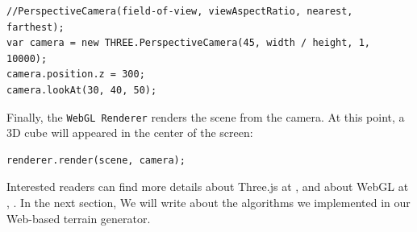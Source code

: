 \begin{lstlisting}
//PerspectiveCamera(field-of-view, viewAspectRatio, nearest, farthest);
var camera = new THREE.PerspectiveCamera(45, width / height, 1, 10000);
camera.position.z = 300;
camera.lookAt(30, 40, 50);
\end{lstlisting}

Finally, the \texttt{WebGL Renderer} renders the scene from the camera. At this point, a 3D cube will appeared in the center of the screen:

\begin{lstlisting}
renderer.render(scene, camera);
\end{lstlisting} 
  
Interested readers can find more details about Three.js at \cite{threeJS}, and about WebGL at \cite{wiki:webgl}, \cite{learningWebGL}. In the next section, We will write about the algorithms we implemented in our Web-based terrain generator.

